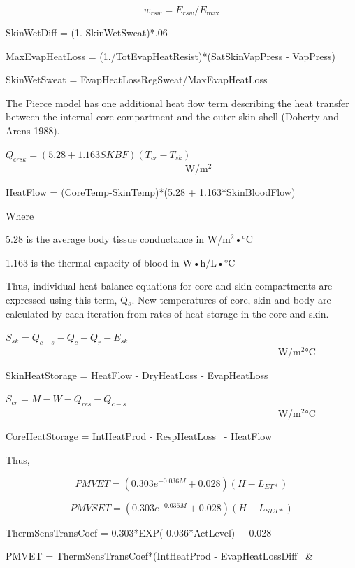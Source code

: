 \begin{equation}
{w_{rsw}} = {E_{rsw}}/{E_{\max }}
\end{equation}

SkinWetDiff = (1.-SkinWetSweat)*.06

MaxEvapHeatLoss = (1./TotEvapHeatResist)*(SatSkinVapPress - VapPress)

SkinWetSweat = EvapHeatLossRegSweat/MaxEvapHeatLoss

The Pierce model has one additional heat flow term describing the heat transfer between the internal core compartment and the outer skin shell (Doherty and Arens 1988).

\({Q_{crsk}} = (5.28 + 1.163SKBF)({T_{cr}} - {T_{sk}})\) ~~~~~~~~~~~~~~~~~~~~~~~~~~~~~~~~~~~~ W/m\(^{2}\)

HeatFlow = (CoreTemp-SkinTemp)*(5.28 + 1.163*SkinBloodFlow)

Where

5.28 is the average body tissue conductance in W/m\(^{2}\)•°C

1.163 is the thermal capacity of blood in W•h/L•°C

Thus, individual heat balance equations for core and skin compartments are expressed using this term, Q\(_{s}\). New temperatures of core, skin and body are calculated by each iteration from rates of heat storage in the core and skin.

\({S_{sk}} = {Q_{c - s}} - {Q_c} - {Q_r} - {E_{sk}}\) ~~~~~~~~~~~~~~~~~~~~~~~~~~~~~~~~~~~~~~~~~~~~~~~~~~~~~~~ W/m\(^{2}\)°C

SkinHeatStorage = HeatFlow - DryHeatLoss - EvapHeatLoss

\({S_{cr}} = M - W - {Q_{res}} - {Q_{c - s}}\) ~~~~~~~~~~~~~~~~~~~~~~~~~~~~~~~~~~~~~~~~~~~~~~~~~~~~~~~ W/m\(^{2}\)°C

CoreHeatStorage = IntHeatProd - RespHeatLoss~ - HeatFlow

Thus,

\begin{equation}
PMVET = (0.303{e^{ - 0.036M}} + 0.028)(H - {L_{ET*}})
\end{equation}

\begin{equation}
PMVSET = (0.303{e^{ - 0.036M}} + 0.028)(H - {L_{SET*}})
\end{equation}

ThermSensTransCoef = 0.303*EXP(-0.036*ActLevel) + 0.028

PMVET = ThermSensTransCoef*(IntHeatProd - EvapHeatLossDiff~ \&

